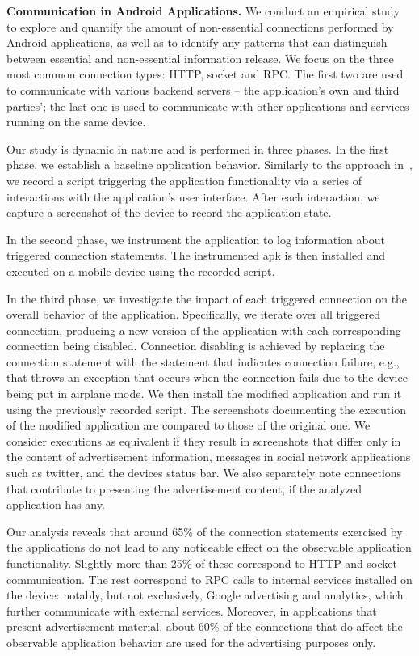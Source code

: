 \vspace{0.1in}
\noindent 
{\bf Communication in Android Applications.}
We conduct an empirical study to explore and quantify the amount of non-essential connections performed by Android applications, as well as to identify any patterns that can distinguish between essential and non-essential information release. 
We focus on the three most common connection types: HTTP, socket and RPC.
The first two are used to communicate with various backend servers -- the application's own and third parties'; 
the last one is used to communicate with other applications and services running on the same device.

Our study is dynamic in nature and is performed in three phases. 
In the first phase, we establish a baseline application behavior. 
Similarly to the approach in~\cite{Hornyack:Han:Jung:Schechter:Wetherall:CCS11}, we record a script triggering the application functionality via a series of interactions with the application's user interface. 
After each interaction, we capture a screenshot of the device to record the application state. 

In the second phase, we instrument the application to log information about 
triggered connection statements. The instrumented apk is then installed and executed on a mobile device using the recorded script. 

In the third phase, we investigate the impact of each triggered connection on the overall behavior of the application.
Specifically, we iterate over all triggered connection, producing a new version of the application with each corresponding connection being disabled. Connection disabling is achieved by replacing the connection statement with the
statement that indicates connection failure, e.g., that throws an exception that occurs when the connection fails due to the device being put in airplane mode. 
We then install the modified application and run it using the previously recorded script. The screenshots documenting 
the execution of the modified application are compared to those of the original one. We consider executions as equivalent if they result in screenshots that differ only in the content of advertisement information, messages in social network applications such as twitter, and the devices status bar. 
We also separately note connections that contribute to presenting the advertisement content, if the analyzed application has any. 

Our analysis reveals that around 65\% of the connection statements exercised by the applications do not lead to any noticeable effect on the observable application functionality.
Slightly more than 25\% of these correspond to HTTP and socket communication. The rest correspond to RPC calls to internal services installed on the device: notably, but not exclusively, Google advertising and analytics, which further communicate with external services. 
Moreover, in applications that present advertisement material, about 60\% of the connections that do affect the observable application behavior are used for the advertising purposes only.

